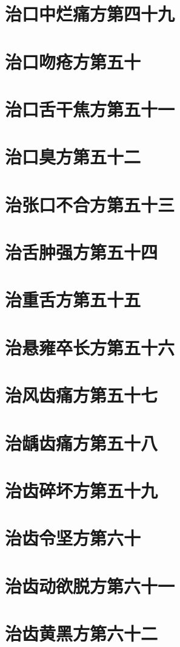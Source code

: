 \documentclass[a4paper,12pt,UTF8,twoside]{ctexbook}
\begin{document}
\chapter{治口中烂痛方第四十九}
\chapter{治口吻疮方第五十}
\chapter{治口舌干焦方第五十一}
\chapter{治口臭方第五十二}
\chapter{治张口不合方第五十三}
\chapter{治舌肿强方第五十四}
\chapter{治重舌方第五十五}
\chapter{治悬雍卒长方第五十六}
\chapter{治风齿痛方第五十七}
\chapter{治龋齿痛方第五十八}
\chapter{治齿碎坏方第五十九}
\chapter{治齿令坚方第六十}
\chapter{治齿动欲脱方第六十一}
\chapter{治齿黄黑方第六十二}
\end{document}
